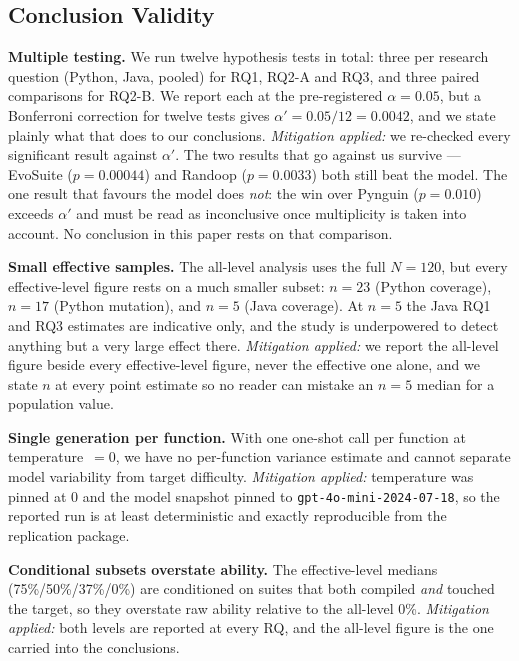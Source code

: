 \subsection{Conclusion Validity}

\textbf{Multiple testing.} We run twelve hypothesis tests in total: three per research
question (Python, Java, pooled) for RQ1, RQ2-A and RQ3, and three paired comparisons for
RQ2-B. We report each at the pre-registered $\alpha=0.05$, but a Bonferroni correction for
twelve tests gives $\alpha' = 0.05/12 = 0.0042$, and we state plainly what that does to our
conclusions. \emph{Mitigation applied:} we re-checked every significant result against
$\alpha'$. The two results that go against us survive --- EvoSuite ($p=0.00044$) and Randoop
($p=0.0033$) both still beat the model. The one result that favours the model does
\emph{not}: the win over Pynguin ($p=0.010$) exceeds $\alpha'$ and must be read as
inconclusive once multiplicity is taken into account. No conclusion in this paper rests on
that comparison.

\textbf{Small effective samples.} The all-level analysis uses the full $N=120$, but every
effective-level figure rests on a much smaller subset: $n=23$ (Python coverage), $n=17$
(Python mutation), and $n=5$ (Java coverage). At $n=5$ the Java RQ1 and RQ3 estimates are
indicative only, and the study is underpowered to detect anything but a very large effect
there. \emph{Mitigation applied:} we report the all-level figure beside every effective-level
figure, never the effective one alone, and we state $n$ at every point estimate so no reader
can mistake an $n=5$ median for a population value.

\textbf{Single generation per function.} With one one-shot call per function at
temperature~$=0$, we have no per-function variance estimate and cannot separate model
variability from target difficulty. \emph{Mitigation applied:} temperature was pinned at 0
and the model snapshot pinned to \texttt{gpt-4o-mini-2024-07-18}, so the reported run is at
least deterministic and exactly reproducible from the replication package.

\textbf{Conditional subsets overstate ability.} The effective-level medians
(75\%/50\%/37\%/0\%) are conditioned on suites that both compiled \emph{and} touched the
target, so they overstate raw ability relative to the all-level 0\%. \emph{Mitigation
applied:} both levels are reported at every RQ, and the all-level figure is the one carried
into the conclusions.

